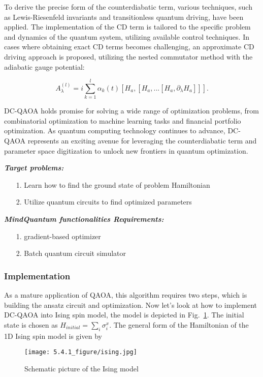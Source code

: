 To derive the precise form of the counterdiabatic term, various techniques, such as Lewis-Riesenfeld invariants and transitionless quantum driving, have been applied. The implementation of the CD term is tailored to the specific problem and dynamics of the quantum system, utilizing available control techniques. In cases where obtaining exact CD terms becomes challenging, an approximate CD driving approach is proposed, utilizing the nested commutator method \cite{Chandarana_2023} with the adiabatic gauge potential:

\begin{equation}
    A_{\lambda}^{(l)} = i\sum_{k=1}^{l}\alpha_{k}(t)[H_{a},[H_{a},...[H_{a}, \partial_{\lambda}H_{a}]]].
\end{equation}

DC-QAOA holds promise for solving a wide range of optimization problems, from combinatorial optimization to machine learning tasks and financial portfolio optimization. As quantum computing technology continues to advance, DC-QAOA represents an exciting avenue for leveraging the counterdiabatic term and parameter space digitization to unlock new frontiers in quantum optimization.

\textbf{\textit{Target problems:}}
\begin{itemize}
    \item[1.] Learn how to find the ground state of problem Hamiltonian
    \item[2.] Utilize quantum circuits to find optimized parameters
\end{itemize}
\textbf{\textit{MindQuantum functionalities Requirements:}}
\begin{itemize}
    \item[1.] gradient-based optimizer
    \item[2.] Batch quantum circuit simulator

\end{itemize}

\subsubsection{Implementation}
As a mature application of QAOA, this algorithm requires two steps, which is building the ansatz circuit and optimization. Now let's look at how to implement DC-QAOA into Ising spin model, the model is depicted in Fig.~\ref{fig:ising}. The initial state is chosen as $H_{initial} = \sum_{i}\sigma_{i}^{x}$. The general form of the Hamiltonian of the 1D Ising spin model is given by
\begin{figure}
    \centering
    \texttt{[image: 5.4.1\_figure/ising.jpg]}
    \caption{Schematic picture of the Ising model}
    \label{fig:ising}
\end{figure}

